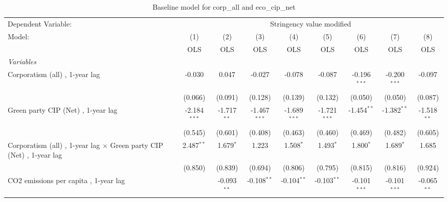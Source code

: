
\begin{table}[htbp]
   \caption{Baseline model for corp\_all and eco\_cip\_net}
   \centering
   \begin{tabular}{lcccccccc}
      \toprule
      Dependent Variable: & \multicolumn{8}{c}{Stringency value modified}\\
      Model:                                                                      & (1)            & (2)           & (3)            & (4)            & (5)            & (6)            & (7)            & (8)\\  
                                                                                  &  OLS           & OLS           & OLS            & OLS            & OLS            & OLS            & OLS            & OLS\\  
      \midrule
      \emph{Variables}\\
      Corporatism (all) , 1-year lag                                              & -0.030         & 0.047         & -0.027         & -0.078         & -0.087         & -0.196$^{***}$ & -0.200$^{***}$ & -0.097\\   
                                                                                  & (0.066)        & (0.091)       & (0.128)        & (0.139)        & (0.132)        & (0.050)        & (0.050)        & (0.087)\\   
      Green party CIP (Net) , 1-year lag                                          & -2.184$^{***}$ & -1.717$^{**}$ & -1.467$^{***}$ & -1.689$^{***}$ & -1.721$^{***}$ & -1.454$^{**}$  & -1.382$^{**}$  & -1.518$^{**}$\\   
                                                                                  & (0.545)        & (0.601)       & (0.408)        & (0.463)        & (0.460)        & (0.469)        & (0.482)        & (0.605)\\   
      Corporatism (all) , 1-year lag $\times$ Green party CIP (Net) , 1-year lag  & 2.487$^{**}$   & 1.679$^{*}$   & 1.223          & 1.508$^{*}$    & 1.493$^{*}$    & 1.800$^{*}$    & 1.689$^{*}$    & 1.685\\   
                                                                                  & (0.850)        & (0.839)       & (0.694)        & (0.806)        & (0.795)        & (0.815)        & (0.816)        & (0.924)\\   
      CO2 emissions per capita , 1-year lag                                       &                & -0.093$^{**}$ & -0.108$^{**}$  & -0.104$^{**}$  & -0.103$^{**}$  & -0.101$^{***}$ & -0.101$^{***}$ & -0.065$^{**}$\\   

\end{tabular}
\end{table}
